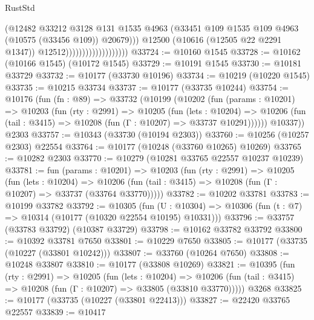 \begin{lexlean}{RustStd}
\begin{coremodule}
                                            (@12482
                                              @33212
                                              @3128
                                              @131
                                              @1535
                                              @4963
                                              (@33451
                                                @109
                                                @1535
                                                @109
                                                @4963
                                                (@10575 (@33456 @109))
                                                @20679)))
                                          @12500
                                          (@10616 (@12505 @22 @2291 @1347))
                                          @12512)))))))))))))))))))
@33724 := @10160 @1545
@33728 := @10162 (@10166 @1545) (@10172 @1545)
@33729 := @10191 @1545
@33730 := @10181 @33729
@33732 := @10177 (@33730 @10196)
@33734 := @10219 (@10220 @1545)
@33735 := @10215 @33734
@33737 := @10177 (@33735 @10244)
@33754 := @10176
    (fun (fn : @89) =>
    @33732
      (@10199
        (@10202
          (fun (params : @10201) =>
          @10203
            (fun (rty : @2991) =>
            @10205
              (fun (lets : @10204) =>
              @10206 (fun (tail : @3415) => @10208 (fun (Γ : @10207) => @33737 @10291))))))
        @10337))
    @2303
@33757 := @10343 (@33730 (@10194 @2303))
@33760 := @10256 (@10257 @2303) @22554
@33764 := @10177 (@10248 (@33760 @10265) @10269)
@33765 := @10282 @2303
@33770 := @10279 (@10281 @33765 @22557 @10237 @10239)
@33781 := fun (params : @10201) =>
  @10203
    (fun (rty : @2991) =>
    @10205
      (fun (lets : @10204) =>
      @10206 (fun (tail : @3415) => @10208 (fun (Γ : @10207) => @33737 (@33764 @33770)))))
@33782 := @10202 @33781
@33783 := @10199 @33782
@33792 := @10305
    (fun (U : @10304) => @10306 (fun (t : @7) => @10314 (@10177 (@10320 @22554 @10195) @10331)))
@33796 := @33757 (@33783 @33792) (@10387 @33729)
@33798 := @10162 @33782 @33792
@33800 := @10392 @33781 @7650
@33801 := @10229 @7650
@33805 := @10177 (@33735 (@10227 (@33801 @10242)))
@33807 := @33760 (@10264 @7650)
@33808 := @10248 @33807
@33810 := @10177 (@33808 @10269)
@33821 := @10395
    (fun (rty : @2991) =>
    @10205
      (fun (lets : @10204) =>
      @10206 (fun (tail : @3415) => @10208 (fun (Γ : @10207) => @33805 (@33810 @33770)))))
    @3268
@33825 := @10177 (@33735 (@10227 (@33801 @22413)))
@33827 := @22420 @33765 @22557
@33839 := @10417

\end{coremodule}
\end{lexlean}
